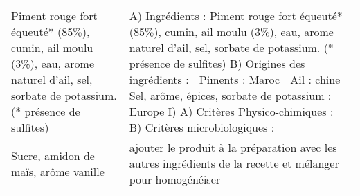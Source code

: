 \begin{longtable}{p{7cm}p{7cm}}
                                                                                                                                                                 Piment rouge fort équeuté* (85\%), cumin, ail moulu (3\%), eau, arome naturel d'ail, sel, sorbate de potassium. (* présence de sulfites) &                                                       A) Ingrédients :  \newline   \newline Piment  rouge  fort  équeuté*  (85\%),  cumin,  ail  moulu  (3\%),  eau,  arome  naturel  d’ail,  sel,  sorbate  de  \newline potassium. (* présence de sulfites)  \newline   \newline B) Origines des ingrédients :  \newline   \newline   Piments : Maroc  \newline   Ail : chine  \newline   Sel, arôme, épices, sorbate de potassium : Europe  \newline   \newline I)  \newline   \newline A) Critères Physico-chimiques :  \newline   \newline   \newline   \newline   \newline   \newline B) Critères microbiologiques :  \newline   \\
                                                                                                                                                                                                                                                                   Sucre, amidon de maïs, arôme vanille &                                                                                                                                                                                                                                                                                                                                                             ajouter le produit à la préparation avec les autres ingrédients de la recette et mélanger pour homogénéiser \\

\end{longtable}
